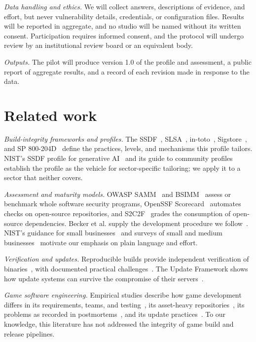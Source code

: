 \documentclass[acmsmall,screen,review]{acmart}
\begin{document}
\emph{Data handling and ethics.} We will collect answers, descriptions of evidence, and effort, but never vulnerability details, credentials, or configuration files. Results will be reported in aggregate, and no studio will be named without its written consent. Participation requires informed consent, and the protocol will undergo review by an institutional review board or an equivalent body.

\emph{Outputs.} The pilot will produce version 1.0 of the profile and assessment, a public report of aggregate results, and a record of each revision made in response to the data.


\section{Related work}\label{sec:9}

\emph{Build-integrity frameworks and profiles.} The SSDF~\cite{souppaya2022secure,booth2025secure}, SLSA~\cite{openndslsa}, in-toto~\cite{torresarias2019toto}, Sigstore~\cite{newman2022sigstore}, and SP 800-204D~\cite{chandramouli2024strategies} define the practices, levels, and mechanisms this profile tailors. NIST's SSDF profile for generative AI~\cite{booth2024secure} and its guide to community profiles~\cite{pascoe2024nist} establish the profile as the vehicle for sector-specific tailoring; we apply it to a sector that neither covers.

\emph{Assessment and maturity models.} OWASP SAMM~\cite{owaspndsoftware} and BSIMM~\cite{blackndbuilding} assess or benchmark whole software security programs, OpenSSF Scorecard~\cite{zahan2023openssf} automates checks on open-source repositories, and S2C2F~\cite{openndsecure} grades the consumption of open-source dependencies. Becker et al. supply the development procedure we follow~\cite{becker2009developing}. NIST's guidance for small businesses~\cite{paulsen2016small} and surveys of small and medium businesses~\cite{chidukwani2022survey} motivate our emphasis on plain language and effort.

\emph{Verification and updates.} Reproducible builds provide independent verification of binaries~\cite{lamb2022reproducible}, with documented practical challenges~\cite{fourne2023it}. The Update Framework shows how update systems can survive the compromise of their servers~\cite{samuel2010survivable}.

\emph{Game software engineering.} Empirical studies describe how game development differs in its requirements, teams, and testing~\cite{murphyhill2014cowboys}, its asset-heavy repositories~\cite{pascarella2018how}, its problems as recorded in postmortems~\cite{politowski2021game}, and its update practices~\cite{lin2017studying}. To our knowledge, this literature has not addressed the integrity of game build and release pipelines.
\end{document}

